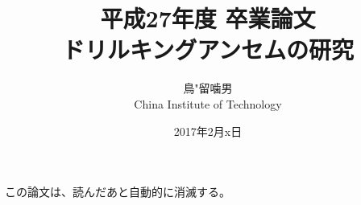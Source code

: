 \documentclass[a4paper,11pt]{jsbook}
\begin{document}
\title{平成27年度 卒業論文\\
ドリルキングアンセムの研究}

\author{鳥"留噛男 \\
China Institute of Technology}

\date{2017年2月x日}

\maketitle

この論文は、読んだあと自動的に消滅する。

\tableofcontents










\newpage
\printindex
\end{document}

